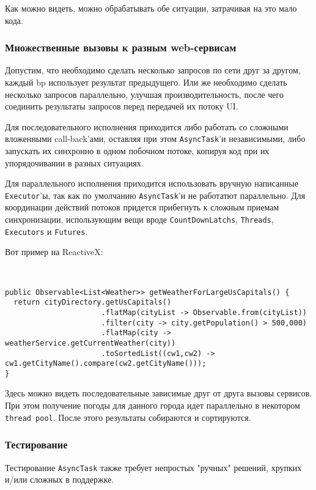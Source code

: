 \documentclass[12pt]{extarticle}
\begin{document}
Как можно видеть, можно обрабатывать обе ситуации, затрачивая на это мало кода.

\subsubsection{Множественные вызовы к разным web-сервисам}

Допустим, что необходимо сделать несколько запросов по сети друг за другом, каждый bp  использует результат предыдущего. Или же необходимо сделать несколько запросов параллельно, улучшая производительность, после чего соединить результаты запросов перед передачей их потоку UI.

Для последовательного исполнения приходится либо работать со сложными вложенными call-back'ами, оставляя при этом \texttt{AsyncTask}'и независимыми, либо запускать их синхронно в одном побочном потоке, копируя код при их упорядочивании в разных ситуациях.

Для параллельного исполнения приходится использовать вручную написанные \texttt{Executor}'ы, так как по умолчанию \texttt{AsyncTask}'и не работатют параллельно.
Для координации действий потоков придется прибегнуть к сложным приемам синхронизации, использующим вещи вроде \texttt{CountDownLatchs}, \texttt{Threads}, \texttt{Executors} и \texttt{Futures}.

Вот пример на ReactiveX:

\

\begin{lstlisting}
public Observable<List<Weather>> getWeatherForLargeUsCapitals() {
  return cityDirectory.getUsCapitals()
                      .flatMap(cityList -> Observable.from(cityList))
                      .filter(city -> city.getPopulation() > 500,000)
                      .flatMap(city -> weatherService.getCurrentWeather(city))
                      .toSortedList((cw1,cw2) -> cw1.getCityName().compare(cw2.getCityName()));
}
\end{lstlisting}

Здесь можно видеть последовательные зависимые друг от друга вызовы сервисов. При этом получение погоды для данного города идет параллельно в некотором \texttt{thread pool}. После этого результаты собираются и сортируются.

\subsubsection{Тестирование}

Тестирование \texttt{AsyncTask} также требует непростых "ручных" решений, хрупких и/или сложных в поддержке.
\end{document}
